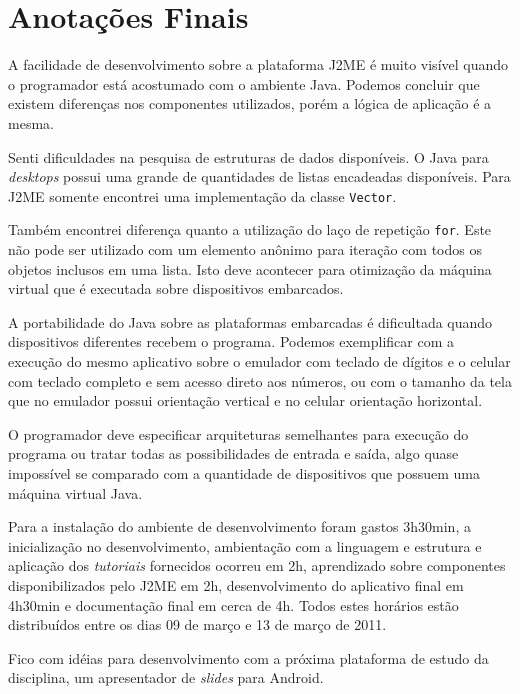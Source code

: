 \documentclass{article}
\begin{document}
\section{Anotações Finais}
\label{sec:finais}

A facilidade de desenvolvimento sobre a plataforma J2ME é muito visível quando o
programador está acostumado com o ambiente Java. Podemos concluir que existem
diferenças nos componentes utilizados, porém a lógica de aplicação é a mesma.

Senti dificuldades na pesquisa de estruturas de dados disponíveis. O Java para
\emph{desktops} possui uma grande de quantidades de listas encadeadas
disponíveis. Para J2ME somente encontrei uma implementação da classe
\texttt{Vector}.

Também encontrei diferença quanto a utilização do laço de repetição
\texttt{for}. Este não pode ser utilizado com um elemento anônimo para iteração
com todos os objetos inclusos em uma lista. Isto deve acontecer para otimização
da máquina virtual que é executada sobre dispositivos embarcados.

A portabilidade do Java sobre as plataformas embarcadas é dificultada quando
dispositivos diferentes recebem o programa. Podemos exemplificar com a execução
do mesmo aplicativo sobre o emulador com teclado de dígitos e o celular com
teclado completo e sem acesso direto aos números, ou com o tamanho da tela que
no emulador possui orientação vertical e no celular orientação horizontal.

O programador deve especificar arquiteturas semelhantes para execução do
programa ou tratar todas as possibilidades de entrada e saída, algo quase
impossível se comparado com a quantidade de dispositivos que possuem uma máquina
virtual Java.

Para a instalação do ambiente de desenvolvimento foram gastos 3h30min, a
inicialização no desenvolvimento, ambientação com a linguagem e estrutura e
aplicação dos \emph{tutoriais} fornecidos ocorreu em 2h, aprendizado sobre
componentes disponibilizados pelo J2ME em 2h, desenvolvimento do aplicativo
final em 4h30min e documentação final em cerca de 4h. Todos estes horários
estão distribuídos entre os dias 09 de março e 13 de março de 2011.

Fico com idéias para desenvolvimento com a próxima plataforma de estudo da
disciplina, um apresentador de \emph{slides} para Android.
\end{document}
